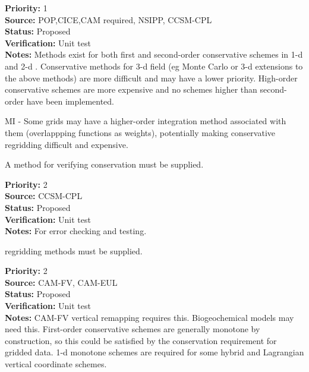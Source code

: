 \begin{reqlist}
{\bf Priority:} 1 \\
{\bf Source:} POP,CICE,CAM required, NSIPP, CCSM-CPL \\
{\bf Status:} Proposed \\
{\bf Verification:} Unit test \\
{\bf Notes:} Methods exist for both first and second-order
             conservative schemes in 1-d and 2-d \cite{Jones1999}.
             Conservative methods for 3-d field (eg Monte Carlo
             or 3-d extensions to the above methods) are more difficult
             and may have a lower priority.
             High-order conservative schemes are more expensive and
             no schemes higher than second-order have been implemented.

             MI - Some grids may have a higher-order integration method
             associated with them (overlappping functions as weights),
             potentially making conservative regridding difficult and expensive.
\end{reqlist}


A method for verifying conservation must be supplied.

\begin{reqlist}
{\bf Priority:} 2 \\
{\bf Source:} CCSM-CPL \\
{\bf Status:} Proposed \\
{\bf Verification:} Unit test \\
{\bf Notes:} For error checking and testing.
\end{reqlist}


 regridding methods must be supplied.

\begin{reqlist}
{\bf Priority:} 2 \\
{\bf Source:} CAM-FV, CAM-EUL \\
{\bf Status:} Proposed \\
{\bf Verification:} Unit test \\
{\bf Notes:} CAM-FV vertical remapping requires this.
	     Biogeochemical models may need this.  First-order
             conservative schemes are generally monotone by
             construction, so this could be satisfied by the
             conservation requirement for gridded data.
             1-d monotone schemes are required for some hybrid
             and Lagrangian vertical coordinate schemes.
\end{reqlist}


